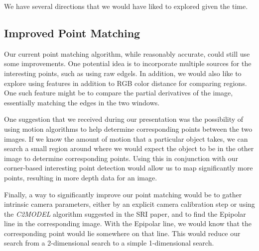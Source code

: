 We have several directions that we would have liked to explored given the time. 

\subsection{Improved Point Matching}
Our current point matching algorithm, while reasonably accurate, could still use some improvements. One potential idea is to incorporate multiple sources for the interesting points, such as using raw edgels. In addition, we would also like to explore using features in addition to RGB color distance for comparing regions. One such feature might be to compare the partial derivatives of the image, essentially matching the edges in the two windows. 

One suggestion that we received during our presentation was the possibility of using motion algorithms to help determine corresponding points between the two images. If we know the amount of motion that a particular object takes, we can search a small region around where we would expect the object to be in the other image to determine corresponding points. Using this in conjunction with our corner-based interesting point detection would allow us to map significantly more points, resulting in more depth data for an image. 

Finally, a way to significantly improve our point matching would be to gather intrinsic camera parameters, either by an explicit camera calibration step or using the \textit{C2MODEL} algorithm suggested in the SRI paper, and to find the Epipolar line in the corresponding image. With the Epipolar line, we would know that the corresponding point would lie somewhere on that line. This would reduce our search from a 2-dimensional search to a simple 1-dimensional search.
